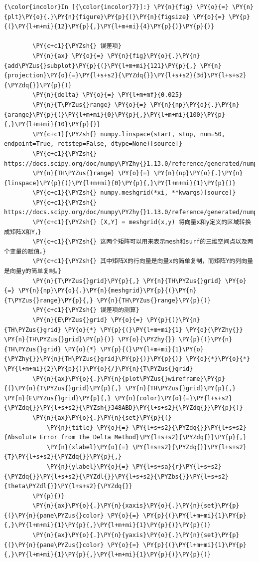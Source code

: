     \begin{Verbatim}[commandchars=\\\{\}]
{\color{incolor}In [{\color{incolor}7}]:} \PY{n}{fig} \PY{o}{=} \PY{n}{plt}\PY{o}{.}\PY{n}{figure}\PY{p}{(}\PY{n}{figsize} \PY{o}{=} \PY{p}{(}\PY{l+m+mi}{12}\PY{p}{,}\PY{l+m+mi}{4}\PY{p}{)}\PY{p}{)}

        \PY{c+c1}{\PYZsh{} 误差项}
        \PY{n}{ax} \PY{o}{=} \PY{n}{fig}\PY{o}{.}\PY{n}{add\PYZus{}subplot}\PY{p}{(}\PY{l+m+mi}{121}\PY{p}{,} \PY{n}{projection}\PY{o}{=}\PY{l+s+s2}{\PYZdq{}}\PY{l+s+s2}{3d}\PY{l+s+s2}{\PYZdq{}}\PY{p}{)}
        \PY{n}{delta} \PY{o}{=} \PY{l+m+mf}{0.025}
        \PY{n}{T\PYZus{}range} \PY{o}{=} \PY{n}{np}\PY{o}{.}\PY{n}{arange}\PY{p}{(}\PY{l+m+mi}{0}\PY{p}{,}\PY{l+m+mi}{100}\PY{p}{,}\PY{l+m+mi}{10}\PY{p}{)}
        \PY{c+c1}{\PYZsh{} numpy.linspace(start, stop, num=50, endpoint=True, retstep=False, dtype=None)[source]}
        \PY{c+c1}{\PYZsh{} https://docs.scipy.org/doc/numpy\PYZhy{}1.13.0/reference/generated/numpy.linspace.html}
        \PY{n}{TH\PYZus{}range} \PY{o}{=} \PY{n}{np}\PY{o}{.}\PY{n}{linspace}\PY{p}{(}\PY{l+m+mi}{0}\PY{p}{,}\PY{l+m+mi}{1}\PY{p}{)}
        \PY{c+c1}{\PYZsh{} numpy.meshgrid(*xi, **kwargs)[source]}
        \PY{c+c1}{\PYZsh{} https://docs.scipy.org/doc/numpy\PYZhy{}1.13.0/reference/generated/numpy.meshgrid.html}
        \PY{c+c1}{\PYZsh{} [X,Y] = meshgrid(x,y) 将向量x和y定义的区域转换成矩阵X和Y，}
        \PY{c+c1}{\PYZsh{} 这两个矩阵可以用来表示mesh和surf的三维空间点以及两个变量的赋值。}
        \PY{c+c1}{\PYZsh{} 其中矩阵X的行向量是向量x的简单复制，而矩阵Y的列向量是向量y的简单复制。}
        \PY{n}{T\PYZus{}grid}\PY{p}{,} \PY{n}{TH\PYZus{}grid} \PY{o}{=} \PY{n}{np}\PY{o}{.}\PY{n}{meshgrid}\PY{p}{(}\PY{n}{T\PYZus{}range}\PY{p}{,} \PY{n}{TH\PYZus{}range}\PY{p}{)}
        \PY{c+c1}{\PYZsh{} 误差项的测算}
        \PY{n}{E\PYZus{}grid} \PY{o}{=} \PY{p}{(}\PY{n}{TH\PYZus{}grid} \PY{o}{*} \PY{p}{(}\PY{l+m+mi}{1} \PY{o}{\PYZhy{}} \PY{n}{TH\PYZus{}grid}\PY{p}{)} \PY{o}{\PYZhy{}} \PY{p}{(}\PY{n}{TH\PYZus{}grid} \PY{o}{*} \PY{p}{(}\PY{l+m+mi}{1}\PY{o}{\PYZhy{}}\PY{n}{TH\PYZus{}grid}\PY{p}{)}\PY{p}{)} \PY{o}{*}\PY{o}{*} \PY{l+m+mi}{2}\PY{p}{)}\PY{o}{/}\PY{n}{T\PYZus{}grid}
        \PY{n}{ax}\PY{o}{.}\PY{n}{plot\PYZus{}wireframe}\PY{p}{(}\PY{n}{T\PYZus{}grid}\PY{p}{,} \PY{n}{TH\PYZus{}grid}\PY{p}{,} \PY{n}{E\PYZus{}grid}\PY{p}{,} \PY{n}{color}\PY{o}{=}\PY{l+s+s2}{\PYZdq{}}\PY{l+s+s2}{\PYZsh{}348ABD}\PY{l+s+s2}{\PYZdq{}}\PY{p}{)}
        \PY{n}{ax}\PY{o}{.}\PY{n}{set}\PY{p}{(}
            \PY{n}{title} \PY{o}{=} \PY{l+s+s2}{\PYZdq{}}\PY{l+s+s2}{Absolute Error from the Delta Method}\PY{l+s+s2}{\PYZdq{}}\PY{p}{,}
            \PY{n}{xlabel}\PY{o}{=} \PY{l+s+s2}{\PYZdq{}}\PY{l+s+s2}{T}\PY{l+s+s2}{\PYZdq{}}\PY{p}{,}
            \PY{n}{ylabel}\PY{o}{=} \PY{l+s+sa}{r}\PY{l+s+s2}{\PYZdq{}}\PY{l+s+s2}{\PYZdl{}}\PY{l+s+s2}{\PYZbs{}}\PY{l+s+s2}{theta\PYZdl{}}\PY{l+s+s2}{\PYZdq{}}
        \PY{p}{)}
        \PY{n}{ax}\PY{o}{.}\PY{n}{xaxis}\PY{o}{.}\PY{n}{set}\PY{p}{(}\PY{n}{pane\PYZus{}color} \PY{o}{=} \PY{p}{(}\PY{l+m+mi}{1}\PY{p}{,}\PY{l+m+mi}{1}\PY{p}{,}\PY{l+m+mi}{1}\PY{p}{)}\PY{p}{)}
        \PY{n}{ax}\PY{o}{.}\PY{n}{yaxis}\PY{o}{.}\PY{n}{set}\PY{p}{(}\PY{n}{pane\PYZus{}color} \PY{o}{=} \PY{p}{(}\PY{l+m+mi}{1}\PY{p}{,}\PY{l+m+mi}{1}\PY{p}{,}\PY{l+m+mi}{1}\PY{p}{)}\PY{p}{)}


\end{Verbatim}
